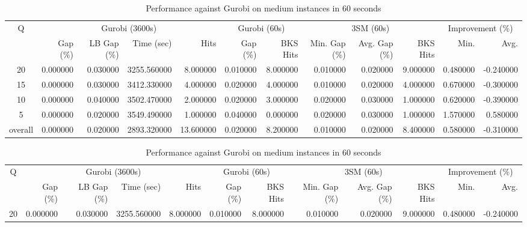 \begin{table}[H]
\caption{Performance against Gurobi on medium instances in 60 seconds}
\label{tab:3lm_resuts150T60}
\begin{tabular}{c rrrr rr rrr rr}
\toprule
Q & \multicolumn{4}{c}{Gurobi (3600s)} & \multicolumn{2}{c}{Gurobi (60s)} & \multicolumn{3}{c}{3SM (60s)} & \multicolumn{2}{c}{Improvement (\%)} \\
 & Gap (\%) & LB Gap (\%) & Time (sec) & Hits & Gap (\%) & BKS Hits & Min. Gap (\%) & Avg. Gap (\%) & BKS Hits & Min. & Avg. \\
\midrule
\cmidrule(lr){1-1} \cmidrule(lr){2-5} \cmidrule(lr){2-5} \cmidrule(lr){6-7} \cmidrule(lr){8-10} \cmidrule(lr){11-12}
20 & 0.000000 & 0.030000 & 3255.560000 & 8.000000 & 0.010000 & 8.000000 & 0.010000 & 0.020000 & 9.000000 & 0.480000 & -0.240000 \\
15 & 0.000000 & 0.030000 & 3412.330000 & 4.000000 & 0.020000 & 4.000000 & 0.010000 & 0.020000 & 4.000000 & 0.670000 & -0.300000 \\
10 & 0.000000 & 0.040000 & 3502.470000 & 2.000000 & 0.020000 & 3.000000 & 0.020000 & 0.030000 & 1.000000 & 0.620000 & -0.390000 \\
5 & 0.000000 & 0.020000 & 3549.490000 & 1.000000 & 0.040000 & 0.000000 & 0.020000 & 0.030000 & 1.000000 & 1.570000 & 0.580000 \\
\midrule
overall & 0.000000 & 0.020000 & 2893.320000 & 13.600000 & 0.020000 & 8.200000 & 0.010000 & 0.020000 & 8.400000 & 0.580000 & -0.310000 \\
\bottomrule
\end{tabular}
\end{table}\begin{table}[H]
\caption{Performance against Gurobi on medium instances in 60 seconds}
\label{tab:3lm_resuts150T60}
\begin{tabular}{c rrrr rr rrr rr}
\toprule
Q & \multicolumn{4}{c}{Gurobi (3600s)} & \multicolumn{2}{c}{Gurobi (60s)} & \multicolumn{3}{c}{3SM (60s)} & \multicolumn{2}{c}{Improvement (\%)} \\
 & Gap (\%) & LB Gap (\%) & Time (sec) & Hits & Gap (\%) & BKS Hits & Min. Gap (\%) & Avg. Gap (\%) & BKS Hits & Min. & Avg. \\
\midrule
\cmidrule(lr){1-1} \cmidrule(lr){2-5} \cmidrule(lr){2-5} \cmidrule(lr){6-7} \cmidrule(lr){8-10} \cmidrule(lr){11-12}
20 & 0.000000 & 0.030000 & 3255.560000 & 8.000000 & 0.010000 & 8.000000 & 0.010000 & 0.020000 & 9.000000 & 0.480000 & -0.240000 \\

\end{tabular}
\end{table}
